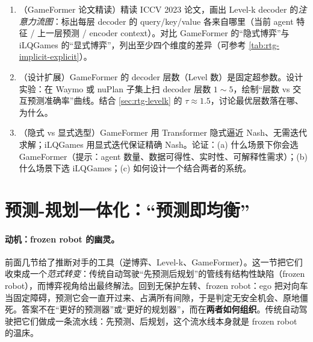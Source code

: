 \begin{practice}
\begin{enumerate}
  \item （GameFormer 论文精读）精读 ICCV 2023 论文，画出 Level-k decoder 的\emph{注意力流图}：标出每层 decoder 的 query/key/value 各来自哪里（当前 agent 特征 / 上一层预测 / encoder context）。对比 GameFormer 的“隐式博弈”与 iLQGames 的“显式博弈”，列出至少四个维度的差异（可参考 \cref{tab:rtg-implicit-explicit}）。
  \item （设计扩展）GameFormer 的 decoder 层数（Level 数）是固定超参数。设计实验：在 Waymo 或 nuPlan 子集上扫 decoder 层数 $1\sim5$，绘制“层数 vs 交互预测准确率”曲线。结合 \cref{sec:rtg-levelk} 的 $\tau\approx1.5$，讨论最优层数落在哪、为什么。
  \item （隐式 vs 显式选型）GameFormer 用 Transformer 隐式逼近 Nash、无需迭代求解；iLQGames 用显式迭代保证精确 Nash。论证：(a) 什么场景下你会选 GameFormer（提示：agent 数量、数据可得性、实时性、可解释性需求）；(b) 什么场景下选 iLQGames；(c) 如何设计一个结合两者的系统。
\end{enumerate}
\end{practice}

\section{预测-规划一体化：“预测即均衡”}
\label{sec:rtg-pred-eq}

\paragraph{动机：frozen robot 的幽灵。}
前面几节给了推断对手的工具（逆博弈、Level-k、GameFormer）。这一节把它们收束成一个\emph{范式转变}：传统自动驾驶“先预测后规划”的管线有结构性缺陷（frozen robot），而博弈视角给出最终解法。回到无保护左转、frozen robot：ego 把对向车当固定障碍，预测它会一直开过来、占满所有间隙，于是判定无安全机会、原地僵死。答案不在“更好的预测器”或“更好的规划器”，而在\textbf{两者如何组织}。传统自动驾驶把它们做成一条流水线：先预测、后规划，这个流水线本身就是 frozen robot 的温床。

